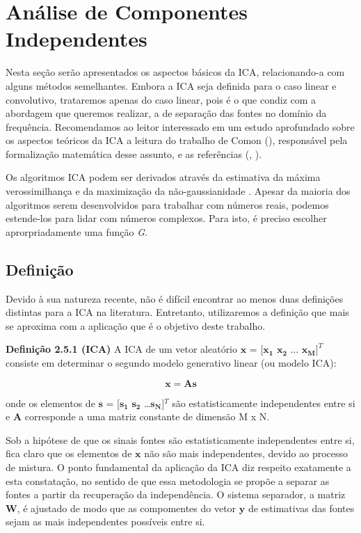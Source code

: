 \section{Análise de Componentes Independentes}
    Nesta seção serão apresentados os aspectos básicos da ICA, relacionando-a com alguns métodos semelhantes. Embora a ICA seja definida para o caso linear e convolutivo, trataremos apenas do caso linear, pois é o que condiz com a abordagem que queremos realizar, a de separação das fontes no domínio da frequência. Recomendamos ao leitor interessado em um estudo aprofundado sobre os aspectos teóricos da ICA a leitura do trabalho de Comon (\cite{Comon}), responsável pela formalização matemática desse assunto, e as referências (\cite{ICA}, \cite{ICA3}).
    
    Os algoritmos ICA podem ser derivados através da estimativa da máxima verossimilhança \cite{ICAML} e da maximização da não-gaussianidade \cite{ICAgauss}. Apesar da maioria dos algoritmos serem desenvolvidos para trabalhar com números reais, podemos estende-los para lidar com números complexos. Para isto, é preciso escolher aprorpriadamente uma função \textit{G}.

\subsection{Definição}
    Devido à sua natureza recente, não é difícil encontrar ao menos duas definições distintas para a ICA na literatura. Entretanto, utilizaremos a definição que mais se aproxima com a aplicação que é o objetivo deste trabalho.
    
    \bigskip
    
    \textbf{Definição 2.5.1 (ICA)} A ICA de um vetor aleatório $\mathbf{x}$ = [$\mathbf{x_1}$ $\mathbf{x_2}$ $\dots$  $\mathbf{x_M}]^T$ consiste em determinar o segundo modelo generativo linear (ou modelo ICA):
    
    \begin{equation}\label{eq:simplifiedmixer}
        \mathbf{x} = \mathbf{A}\mathbf{s}
    \end{equation}
    
    onde os elementos de $\mathbf{s}$ = [$\mathbf{s_1}$ $\mathbf{s_2}$ \dots  $\mathbf{s_N}$]$^T$ são estatisticamente independentes entre si e $\mathbf{A}$ corresponde a uma matriz constante de dimensão M x N.

    \bigskip 
    
    Sob a hipótese de que os sinais fontes são estatisticamente independentes entre si, fica claro que os elementos de $\mathbf{x}$ não são mais independentes, devido ao processo de mistura. O ponto fundamental da aplicação da ICA diz respeito exatamente a esta constatação, no sentido de que essa metodologia se propõe a separar as fontes a partir da recuperação da independência. O sistema separador, a matriz $\mathbf{W}$, é ajustado de modo que as compomentes do vetor $\mathbf{y}$ de estimativas das fontes sejam as mais independentes possíveis entre si.
    
